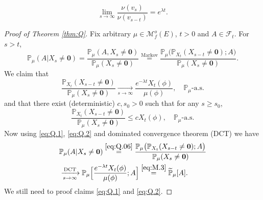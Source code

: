 \documentclass[12pt,a4paper]{amsart}
\numberwithin{equation}{section}
\theoremstyle{plain}
\theoremstyle{definition}
\theoremstyle{remark}
\begin{document}
\begin{equation}\label{eq:Q.057}
	\lim_{s\to \infty} \frac{\nu(v_s)}{\nu(v_{s-t})} = e^{\lambda t}.
\end{equation}
\begin{proof}[Proof of Theorem \ref{thm:Q}]
	Fix arbitrary $\mu\in \mathcal M^o_f(E)$, $t>0$ and $A\in\mathscr F_t$. 
	For $s>t$, 
\begin{equation} \label{eq:Q.06}
	\mathbb P_\mu(A|X_s\neq \mathbf 0)
	=\frac{\mathbb P_\mu(A, X_s \neq \mathbf 0)}{\mathbb P_\mu(X_s\neq \mathbf 0)}
	\overset{\text{Markov}}=\frac{\mathbb P_\mu\big(\mathbb P_{X_t}(X_{s-t} \neq \mathbf 0);A\big)}{\mathbb P_\mu(X_s\neq \mathbf 0)}.%
\end{equation}
	We claim that 
\begin{equation} \label{eq:Q.1}
	\frac{\mathbb P_{X_t}(X_{s-t} \neq \mathbf 0)}{\mathbb P_\mu(X_{s} \neq \mathbf 0)}
	\xrightarrow[s\to \infty]{} \frac{e^{-\lambda t}X_t(\phi)}{\mu(\phi) }, 
	\quad \mathbb P_\mu\text{-a.s.}
\end{equation}
	and that there exist (deterministic) $c,s_0>0$ such that for any $s\geq s_0$,
\begin{equation} \label{eq:Q.2}
	\frac{\mathbb P_{X_t}(X_{s-t} \neq \mathbf 0)}{\mathbb P_\mu(X_{s} \neq \mathbf 0)} 
	\leq cX_t(\phi), \quad \mathbb P_\mu\text{-a.s.}
\end{equation}
	Now using \eqref{eq:Q.1}, \eqref{eq:Q.2} and dominated convergence theorem (DCT) we have
\begin{align} 
&  \mathbb P_\mu(A|X_s\neq \mathbf 0) 
	\overset{\eqref{eq:Q.06}}=  \frac{\mathbb P_\mu\big(\mathbb P_{X_t}(X_{s-t} \neq \mathbf 0);A\big)}{\mathbb P_\mu(X_s\neq \mathbf 0)}
	\\&\xrightarrow[s\to \infty]{\text{DCT}} \mathbb P_\mu\Big[\frac{e^{-\lambda t}X_t(\phi)}{\mu(\phi) }; A\Big]
	\overset{\eqref{eq:M.3}} = \widetilde{\mathbb P}_\mu[A]. 
\end{align}
	We still need to proof claims \eqref{eq:Q.1} and \eqref{eq:Q.2}.

\end{proof}
\end{document}
